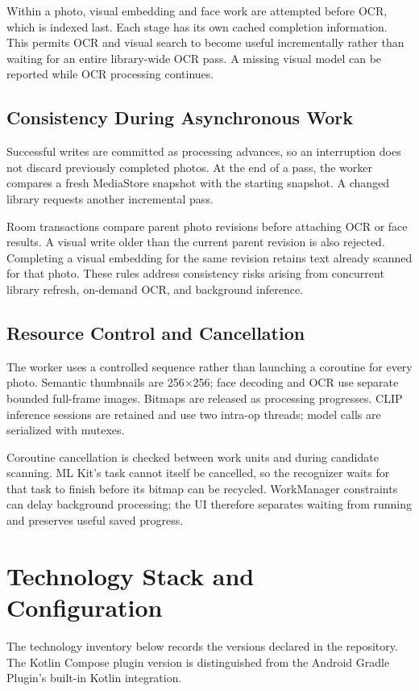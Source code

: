 \documentclass[11pt,a4paper]{article}
\newcommand{\reportsection}[1]{\section{#1}}
\begin{document}
Within a photo, visual embedding and face work are attempted before OCR, which is indexed last. Each stage has its own cached completion information. This permits OCR and visual search to become useful incrementally rather than waiting for an entire library-wide OCR pass. A missing visual model can be reported while OCR processing continues.

\subsection{Consistency During Asynchronous Work}
Successful writes are committed as processing advances, so an interruption does not discard previously completed photos. At the end of a pass, the worker compares a fresh MediaStore snapshot with the starting snapshot. A changed library requests another incremental pass.

Room transactions compare parent photo revisions before attaching OCR or face results. A visual write older than the current parent revision is also rejected. Completing a visual embedding for the same revision retains text already scanned for that photo. These rules address consistency risks arising from concurrent library refresh, on-demand OCR, and background inference.

\subsection{Resource Control and Cancellation}
The worker uses a controlled sequence rather than launching a coroutine for every photo. Semantic thumbnails are 256\(\times\)256; face decoding and OCR use separate bounded full-frame images. Bitmaps are released as processing progresses. CLIP inference sessions are retained and use two intra-op threads; model calls are serialized with mutexes.

Coroutine cancellation is checked between work units and during candidate scanning. ML Kit's task cannot itself be cancelled, so the recognizer waits for that task to finish before its bitmap can be recycled. WorkManager constraints can delay background processing; the UI therefore separates waiting from running and preserves useful saved progress.


\reportsection{Technology Stack and Configuration}

The technology inventory below records the versions declared in the repository. The Kotlin Compose plugin version is distinguished from the Android Gradle Plugin's built-in Kotlin integration.
\end{document}
